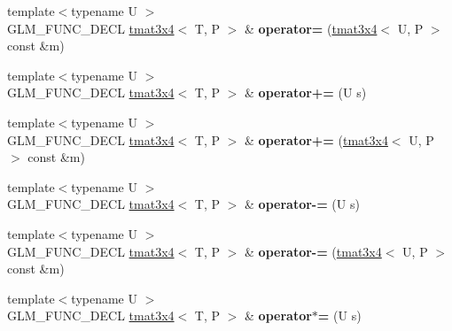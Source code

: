\begin{DoxyCompactItemize}
\item 
\hypertarget{structglm_1_1tmat3x4_a966fd086e06ed72bed9db6e362ac5cd4}{{\footnotesize template$<$typename U $>$ }\\G\-L\-M\-\_\-\-F\-U\-N\-C\-\_\-\-D\-E\-C\-L \hyperlink{structglm_1_1tmat3x4}{tmat3x4}$<$ T, P $>$ \& {\bfseries operator=} (\hyperlink{structglm_1_1tmat3x4}{tmat3x4}$<$ U, P $>$ const \&m)}\label{structglm_1_1tmat3x4_a966fd086e06ed72bed9db6e362ac5cd4}

\item 
\hypertarget{structglm_1_1tmat3x4_a1d168f808a356984b260bf15c3ab8e9e}{{\footnotesize template$<$typename U $>$ }\\G\-L\-M\-\_\-\-F\-U\-N\-C\-\_\-\-D\-E\-C\-L \hyperlink{structglm_1_1tmat3x4}{tmat3x4}$<$ T, P $>$ \& {\bfseries operator+=} (U s)}\label{structglm_1_1tmat3x4_a1d168f808a356984b260bf15c3ab8e9e}

\item 
\hypertarget{structglm_1_1tmat3x4_abf14c7b0bb58128011f4d0283b95cd8e}{{\footnotesize template$<$typename U $>$ }\\G\-L\-M\-\_\-\-F\-U\-N\-C\-\_\-\-D\-E\-C\-L \hyperlink{structglm_1_1tmat3x4}{tmat3x4}$<$ T, P $>$ \& {\bfseries operator+=} (\hyperlink{structglm_1_1tmat3x4}{tmat3x4}$<$ U, P $>$ const \&m)}\label{structglm_1_1tmat3x4_abf14c7b0bb58128011f4d0283b95cd8e}

\item 
\hypertarget{structglm_1_1tmat3x4_a42717b0d74b50223515dc81fd6e76d91}{{\footnotesize template$<$typename U $>$ }\\G\-L\-M\-\_\-\-F\-U\-N\-C\-\_\-\-D\-E\-C\-L \hyperlink{structglm_1_1tmat3x4}{tmat3x4}$<$ T, P $>$ \& {\bfseries operator-\/=} (U s)}\label{structglm_1_1tmat3x4_a42717b0d74b50223515dc81fd6e76d91}

\item 
\hypertarget{structglm_1_1tmat3x4_aaf8bc23469dcf8ffbae4ea49c9ced2cd}{{\footnotesize template$<$typename U $>$ }\\G\-L\-M\-\_\-\-F\-U\-N\-C\-\_\-\-D\-E\-C\-L \hyperlink{structglm_1_1tmat3x4}{tmat3x4}$<$ T, P $>$ \& {\bfseries operator-\/=} (\hyperlink{structglm_1_1tmat3x4}{tmat3x4}$<$ U, P $>$ const \&m)}\label{structglm_1_1tmat3x4_aaf8bc23469dcf8ffbae4ea49c9ced2cd}

\item 
\hypertarget{structglm_1_1tmat3x4_aa9925d090bb78d0e96f418f20e6b2104}{{\footnotesize template$<$typename U $>$ }\\G\-L\-M\-\_\-\-F\-U\-N\-C\-\_\-\-D\-E\-C\-L \hyperlink{structglm_1_1tmat3x4}{tmat3x4}$<$ T, P $>$ \& {\bfseries operator$\ast$=} (U s)}\label{structglm_1_1tmat3x4_aa9925d090bb78d0e96f418f20e6b2104}


\end{DoxyCompactItemize}
